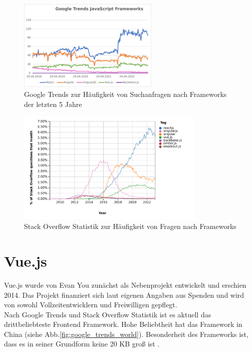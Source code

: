 \begin{figure}[!htb]
    \centering
    \includegraphics[width=0.6\textwidth]{img/Google Stats/google_frameworks_trends}
    \caption{Google Trends zur Häufigkeit von Suchanfragen nach Frameworks der letzten 5 Jahre \cite{googleTrends}}
    \label{fig:google_trends}
\end{figure}

\begin{figure}[!htb]
    \centering
    \includegraphics[width=0.8\textwidth]{img/js_frameworks_statistic_stackoverflow}
    \caption{Stack Overflow Statistik zur Häufigkeit von Fragen nach Frameworks \cite{stackoverflowStats}}
    \label{fig:stackoverflow_stat}
\end{figure}


\newpage


\section{Vue.js}
Vue.js wurde von Evan You zunächst als Nebenprojekt entwickelt und erschien 2014.
Das Projekt finanziert sich laut eigenen Angaben aus Spenden und
wird von sowohl Vollzeitentwicklern und Freiwilligen gepflegt.  \cite{vueFAQ}
\\
Nach Google Trends  \cite{googleTrends} und Stack Overflow Statistik \cite{stackoverflowStats} ist es aktuell das drittbeliebteste
Frontend Framework.
Hohe Beliebtheit hat das Framework in China (siehe Abb.\ref{fig:google_trends_world}).
Besonderheit des Frameworks ist, dass es in seiner Grundform keine 20 KB groß ist \cite[S. 523]{bin2019}.


